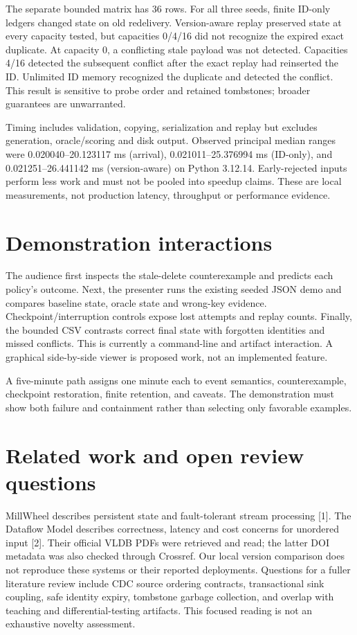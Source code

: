 \documentclass[10pt,twocolumn]{article}
\begin{document}
The separate bounded matrix has 36 rows. For all three seeds, finite ID-only ledgers
changed state on old redelivery. Version-aware replay preserved state at every
capacity tested, but capacities 0/4/16 did not recognize the expired exact duplicate.
At capacity 0, a conflicting stale payload was not detected. Capacities 4/16 detected
the subsequent conflict after the exact replay had reinserted the ID. Unlimited
ID memory recognized the duplicate and detected the conflict. This result is sensitive
to probe order and retained tombstones; broader guarantees are unwarranted.

Timing includes validation, copying, serialization and replay but excludes generation,
oracle/scoring and disk output. Observed principal median ranges were
0.020040--20.123117 ms (arrival), 0.021011--25.376994 ms (ID-only), and
0.021251--26.441142 ms (version-aware) on Python 3.12.14. Early-rejected inputs
perform less work and must not be pooled into speedup claims. These are local
measurements, not production latency, throughput or performance evidence.
\clearpage
\section{Demonstration interactions}
The audience first inspects the stale-delete counterexample and predicts each
policy's outcome. Next, the presenter runs the existing seeded JSON demo and
compares baseline state, oracle state and wrong-key evidence. Checkpoint/interruption
controls expose lost attempts and replay counts. Finally, the bounded CSV contrasts
correct final state with forgotten identities and missed conflicts. This is currently
a command-line and artifact interaction. A graphical side-by-side viewer is proposed
work, not an implemented feature.

A five-minute path assigns one minute each to event semantics, counterexample,
checkpoint restoration, finite retention, and caveats. The demonstration must show
both failure and containment rather than selecting only favorable examples.

\section{Related work and open review questions}
MillWheel describes persistent state and fault-tolerant stream processing [1].
The Dataflow Model describes correctness, latency and cost concerns for unordered
input [2]. Their official VLDB PDFs were retrieved and read; the latter DOI metadata
was also checked through Crossref. Our local version comparison does not reproduce
these systems or their reported deployments. Questions for a fuller literature review
include CDC source ordering contracts, transactional sink coupling, safe identity
expiry, tombstone garbage collection, and overlap with teaching and differential-testing
artifacts. This focused reading is not an exhaustive novelty assessment.
\end{document}
